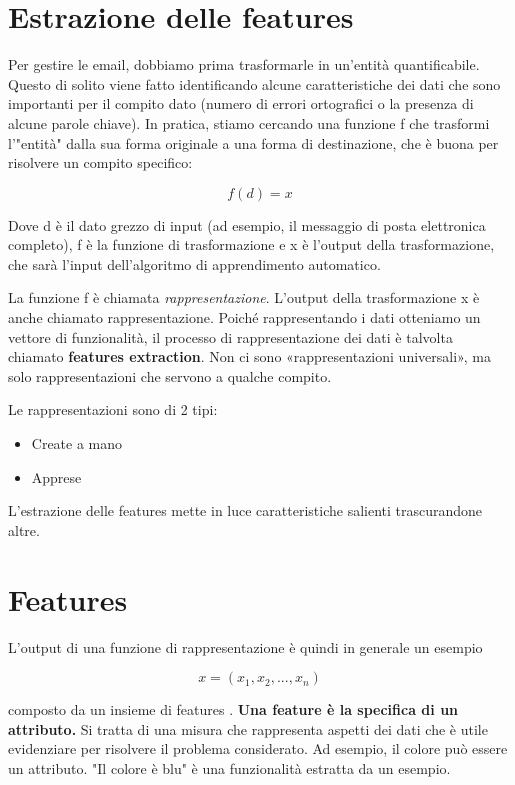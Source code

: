 \section{Estrazione delle features}

Per gestire le email, dobbiamo prima trasformarle in un'entità quantificabile. Questo di solito viene fatto identificando alcune caratteristiche dei dati che sono importanti per il compito dato (numero di errori ortografici o la presenza di alcune parole chiave). In pratica, stiamo cercando una funzione f che trasformi l'"entità" dalla sua forma originale a una forma di destinazione, che è buona per risolvere un compito specifico:

$$f(d) = x$$

Dove d è il dato grezzo di input (ad esempio, il messaggio di posta elettronica completo), f è la funzione di trasformazione e x è l'output della trasformazione, che sarà l'input dell'algoritmo di apprendimento automatico.

La funzione f è chiamata \emph{rappresentazione}. L'output della trasformazione x è anche chiamato rappresentazione.
Poiché rappresentando i dati otteniamo un vettore di funzionalità, il processo di rappresentazione dei dati è talvolta chiamato \textbf{features extraction}. Non ci sono «rappresentazioni universali», ma solo rappresentazioni che servono a qualche compito.

\noindent
Le rappresentazioni sono di 2 tipi:

\begin{itemize}
\item Create a mano
\item Apprese
\end{itemize}

\noindent
L'estrazione delle features mette in luce caratteristiche salienti trascurandone altre.

\section{Features}

L'output di una funzione di rappresentazione è quindi in generale un esempio

$$ x = (x_1, x_2, ..., x_n)$$

\noindent
composto da un insieme di features . \textbf{Una feature è la specifica di un attributo.}
Si tratta di una misura che rappresenta aspetti dei dati che è utile evidenziare per risolvere il problema considerato. Ad esempio, il colore può essere un attributo. "Il colore è blu" è una funzionalità estratta da un esempio.

